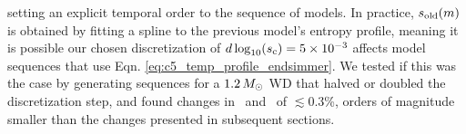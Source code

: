 \noindent setting an explicit temporal order to the sequence of models.  In practice, $s_\mathrm{old}(m)$ is obtained by fitting a spline to the previous model's entropy profile, meaning it is possible our chosen discretization of $d\log_{10}(\Sc) = 5 \times 10^{-3}$ affects model sequences that use Eqn. \ref{eq:c5_temp_profile_endsimmer}.  We tested if this was the case by generating sequences for a $1.2\,\Msun$ WD that halved or doubled the discretization step, and found changes in \rhoc\ and \Tc\ of $\lesssim0.3$\%, orders of magnitude smaller than the changes presented in subsequent sections.





